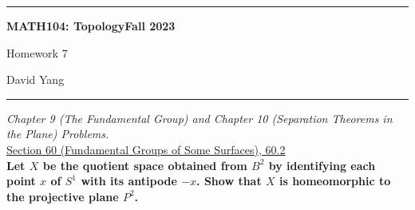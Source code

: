\documentclass[11pt]{article}
\begin{document}
	\hrule
	\begin{center}
        \textbf{MATH104: Topology}\hfill \textbf{Fall 2023}\newline

		{\Large Homework 7}

		David Yang
	\end{center}

\hrule

\vspace{1em}

\textit{Chapter 9 (The Fundamental Group) and Chapter 10 (Separation Theorems in the Plane) Problems.} \\

\underline{Section 60 (Fundamental Groups of Some Surfaces), 60.2} \\

\textbf{Let $X$ be the quotient space obtained from $B^2$ by identifying each point $x$ of $S^1$ with its antipode $-x$. 
Show that $X$ is homeomorphic to the projective plane $P^2$.} 
\end{document}
